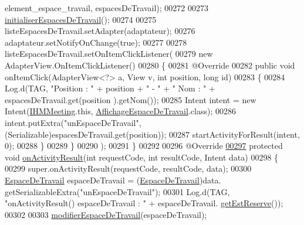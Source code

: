 \begin{DoxyCode}
      element\_espace\_travail, espacesDeTravail);
00272 
00273         \hyperlink{classcom_1_1lasalle_1_1meeting_1_1_i_h_m_meeting_ad4660f416b16b6df0f96d58f4c36b6f6}{initialiserEspacesDeTravail}();
00274 
00275         listeEspacesDeTravail.setAdapter(adaptateur);
00276         adaptateur.setNotifyOnChange(\textcolor{keyword}{true});
00277 
00278         listeEspacesDeTravail.setOnItemClickListener(
00279             \textcolor{keyword}{new} AdapterView.OnItemClickListener()
00280             \{
00281                 @Override
00282                 \textcolor{keyword}{public} \textcolor{keywordtype}{void} onItemClick(AdapterView<?> a, View v, \textcolor{keywordtype}{int} position, \textcolor{keywordtype}{long} \textcolor{keywordtype}{id})
00283                 \{
00284                     Log.d(TAG, \textcolor{stringliteral}{"Position : "} + position + \textcolor{stringliteral}{" - "} + \textcolor{stringliteral}{" Nom : "} + espacesDeTravail.get(position
      ).getNom());
00285                     Intent intent = \textcolor{keyword}{new} Intent(\hyperlink{classcom_1_1lasalle_1_1meeting_1_1_i_h_m_meeting}{IHMMeeting}.this, 
      \hyperlink{classcom_1_1lasalle_1_1meeting_1_1_affichage_espace_de_travail}{AffichageEspaceDeTravail}.class);
00286                     intent.putExtra(\textcolor{stringliteral}{"unEspaceDeTravail"}, (Serializable)espacesDeTravail.get(position));
00287                     startActivityForResult(intent, 0);
00288                 \}
00289             \}
00290         );
00291     \}
00292 
00296     @Override
\hyperlink{classcom_1_1lasalle_1_1meeting_1_1_i_h_m_meeting_aa7f5623eef9a049cf786ff15a4c63274}{00297}     \textcolor{keyword}{protected} \textcolor{keywordtype}{void} \hyperlink{classcom_1_1lasalle_1_1meeting_1_1_i_h_m_meeting_aa7f5623eef9a049cf786ff15a4c63274}{onActivityResult}(\textcolor{keywordtype}{int} requestCode, \textcolor{keywordtype}{int} resultCode, Intent data)
00298     \{
00299         super.onActivityResult(requestCode, resultCode, data);
00300         \hyperlink{classcom_1_1lasalle_1_1meeting_1_1_espace_de_travail}{EspaceDeTravail} espaceDeTravail = (\hyperlink{classcom_1_1lasalle_1_1meeting_1_1_espace_de_travail}{EspaceDeTravail})data.
      getSerializableExtra(\textcolor{stringliteral}{"unEspaceDeTravail"});
00301         Log.d(TAG, \textcolor{stringliteral}{"onActivityResult() espaceDeTravail : "} + espaceDeTravail.
      \hyperlink{classcom_1_1lasalle_1_1meeting_1_1_espace_de_travail_a69fe30f8d3aff92986f4c39402e16ab0}{getEstReserve}());
00302 
00303         \hyperlink{classcom_1_1lasalle_1_1meeting_1_1_i_h_m_meeting_a3367c0a9b9743ca7808cb2265789f9b8}{modifierEspaceDeTravail}(espaceDeTravail);

\end{DoxyCode}
